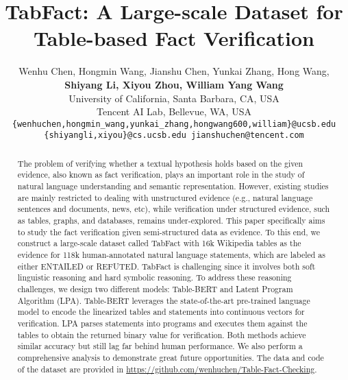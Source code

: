 \documentclass{article} \usepackage{iclr2020_conference,times}
\title{TabFact: A Large-scale Dataset for Table-based Fact Verification}
\author{Wenhu Chen, Hongmin Wang, Jianshu Chen, Yunkai Zhang, Hong Wang, \\
\textbf{Shiyang Li, Xiyou Zhou, William Yang Wang}\\
University of California, Santa Barbara, CA, USA\\
Tencent AI Lab, Bellevue, WA, USA\\
{\tt \{wenhuchen,hongmin\_wang,yunkai\_zhang,hongwang600,william\}@ucsb.edu}\\
{\tt \{shiyangli,xiyou\}@cs.ucsb.edu jianshuchen@tencent.com}
}
\begin{document}
\maketitle

\begin{abstract}
The problem of verifying whether a textual hypothesis holds based on the given evidence, also known as fact verification, plays an important role in the study of natural language understanding and semantic representation. However, existing studies are mainly restricted to dealing with unstructured evidence (e.g., natural language sentences and documents, news, etc), while verification under structured evidence, such as tables, graphs, and databases, remains under-explored. This paper specifically aims to study the fact verification given semi-structured data as evidence. To this end, we construct a large-scale dataset called TabFact with 16k Wikipedia tables as the evidence for 118k human-annotated natural language statements, which are labeled as either ENTAILED or REFUTED. TabFact is challenging since it involves both soft linguistic reasoning and hard symbolic reasoning. To address these reasoning challenges, we design two different models: Table-BERT and Latent Program Algorithm (LPA). Table-BERT leverages the state-of-the-art pre-trained language model to encode the linearized tables and statements into continuous vectors for verification. LPA parses statements into programs and executes them against the tables to obtain the returned binary value for verification. Both methods achieve similar accuracy but still lag far behind human performance. We also perform a comprehensive analysis to demonstrate great future opportunities. The data and code of the dataset are provided in \url{https://github.com/wenhuchen/Table-Fact-Checking}.
\end{abstract}
\end{document}
